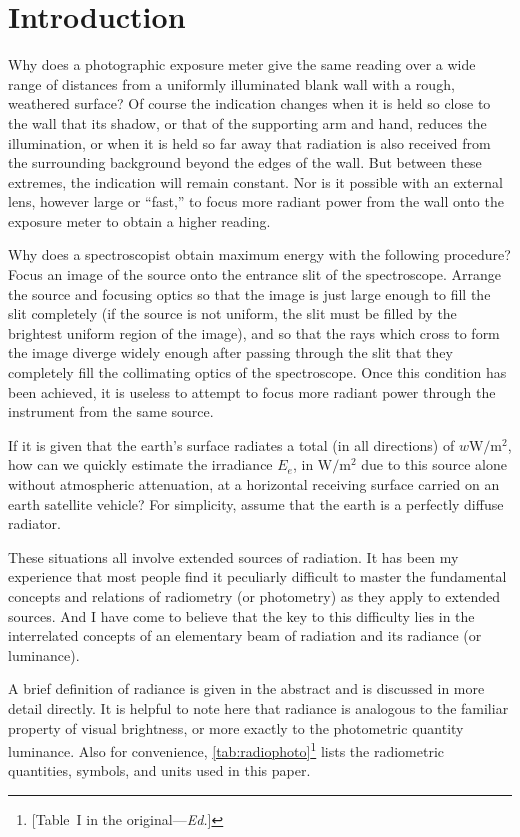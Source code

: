 \section{Introduction}

Why does a photographic exposure meter give the same reading over a wide range
of distances from a uniformly illuminated blank wall with a rough, weathered surface?
Of course the indication changes when it is held so close to the wall that its
shadow,
or that of the supporting arm and hand, reduces the illumination, or when it is
held
so far away that radiation is also received from the surrounding background beyond
the edges of the wall. But between these extremes, the indication will remain
constant.
Nor is it possible with an external lens, however large or “fast,” to focus more radiant
power from the wall onto the exposure meter to obtain a higher reading.

Why does a spectroscopist obtain maximum energy with the following procedure?
Focus an image of the source onto the entrance slit of the spectroscope.
Arrange the source and focusing optics so that the image is just large enough
to fill the slit completely (if the source is not uniform, the slit must be
filled by the brightest uniform region of the image), and so that the
rays which cross to form the image diverge widely enough after passing through
the slit that they completely fill the collimating optics of the
spectroscope. Once this condition has been achieved, it is useless to attempt
to focus more radiant power through the instrument from the same source.

If it is given that the earth's surface radiates a total (in all directions) of
$w\si{\watt\per\square\meter}$, how can we quickly estimate the irradiance
$E_e$,
in $\si{\watt\per\square\meter}$ due to this source alone without atmospheric
attenuation, at a horizontal receiving surface carried on an earth satellite
vehicle?
For simplicity, assume that the earth is a perfectly diffuse radiator.

These situations all involve extended sources of radiation. It has been my experience
that most people find it peculiarly difficult to master the fundamental concepts and
relations of radiometry (or photometry) as they apply to extended sources. And I
have
come to believe that the key to this difficulty lies in the interrelated concepts of an
elementary beam of radiation and its radiance (or luminance).

A brief definition of radiance is given in the abstract and is discussed in more
detail
directly. It is helpful to note here that radiance is analogous to the familiar property
of visual brightness, or more exactly to the photometric quantity luminance.
Also for convenience, \cref{tab:radiophoto}\footnote{[Table~I in the
original---\textit{Ed.}]}
lists the radiometric quantities, symbols, and units used in this paper.

